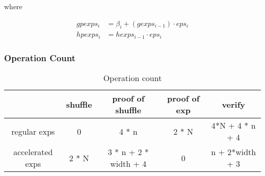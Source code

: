 \documentclass{article}
\begin{document}
where

\begin{align*}
gpexps_i &= \beta_i + (gexps_{i-1}) \cdot eps_i \\
hpexps_i &= hexps_{i-1} \cdot eps_i
\end{align*}

\subsubsection{Operation Count}

\begin{table}[H]
    \centering
    \begin{tabular}{c|c|c|c|c}
        & shuffle  & proof of shuffle  & proof of exp  & verify \\
\hline
regular exps  & 0  & 4 {*} n  & 2 {*} N  & 4{*}N + 4 {*} n + 4 \\
accelerated exps  & 2 {*} N  & 3 {*} n + 2 {*} width + 4  & 0  & n + 2{*}width + 3 \\
    \end{tabular}
    \caption{Operation count}
    \label{tab:my_label}
\end{table}
\end{document}
